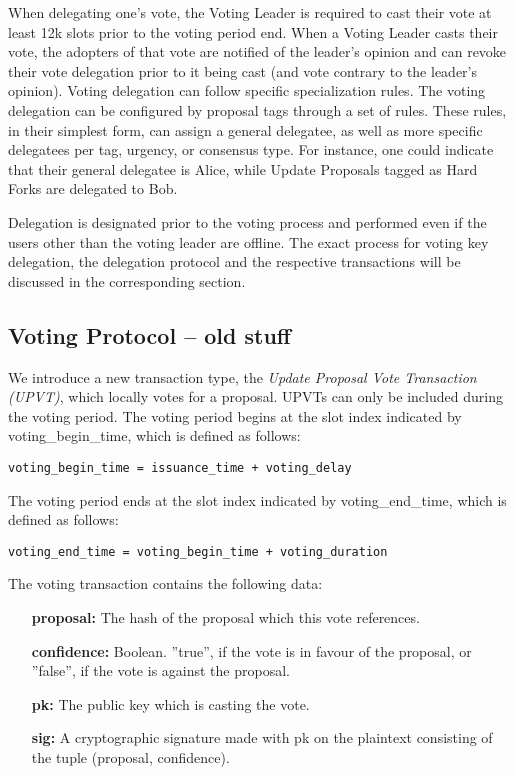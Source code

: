 When delegating one's vote, the Voting Leader is required to cast their vote at least 12k slots prior to the voting period end. When a Voting Leader casts their vote, the adopters of that vote are notified of the leader's opinion and can revoke their vote delegation prior to it being cast (and vote contrary to the leader's opinion).
Voting delegation can follow specific specialization rules. The voting delegation can be configured by proposal tags through a set of rules. These rules, in their simplest form, can assign a general delegatee, as well as more specific delegatees per tag, urgency, or consensus type. For instance, one could indicate that their general delegatee is Alice, while Update Proposals tagged as Hard Forks are delegated to Bob.

Delegation is designated prior to the voting process and performed even if the users other than the voting leader are offline. The exact process for voting key delegation, the delegation protocol and the respective transactions will be discussed in the corresponding section.

\subsection*{Voting Protocol -- old stuff}
We introduce a new transaction type, the \emph{Update Proposal Vote Transaction (UPVT)}, which locally votes for a proposal. UPVTs can only be included during the voting period. 
The voting period begins at the slot index indicated by voting\_begin\_time, which is defined as follows:

\begin{verbatim}
voting_begin_time = issuance_time + voting_delay
\end{verbatim}

The voting period ends at the slot index indicated by voting\_end\_time, which is defined as follows:

\begin{verbatim}
voting_end_time = voting_begin_time + voting_duration
\end{verbatim}

The voting transaction contains the following data:
\begin{itemize}
\item[\textbf{proposal:}] The hash of the proposal which this vote references.
\item[\textbf{confidence:}] Boolean. ''true'', if the vote is in favour of the proposal, or ''false'', if the vote is against the proposal.
\item[\textbf{pk:}] The public key which is casting the vote.
\item[\textbf{sig:}] A cryptographic signature made with pk on the plaintext consisting of the tuple (proposal, confidence).
\end{itemize}

